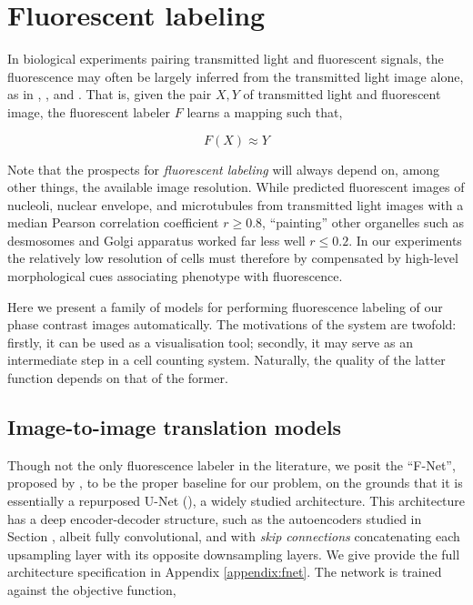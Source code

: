
\section{Fluorescent labeling}
\label{sec:fluorescent_labeling}

In biological experiments pairing transmitted light and fluorescent signals, the fluorescence may often be largely inferred from the transmitted light image alone, as in \cite{christiansen2018silico}, \cite{ounkomol2018label}, and \cite{lee2018deephcs}. That is, given the pair $X, Y$ of transmitted light and fluorescent image, the fluorescent labeler $F$ learns a mapping such that,

\begin{equation}
F(X) \approx Y
\end{equation}

Note that the prospects for \emph{fluorescent labeling} will always depend on, among other things, the available image resolution. While \cite{ounkomol2018label} predicted fluorescent images of nucleoli, nuclear envelope, and microtubules from transmitted light images with a median Pearson correlation coefficient $r \geq 0.8$, ``painting'' other organelles such as desmosomes and Golgi apparatus worked far less well $r \leq 0.2$. In our experiments the relatively low resolution of cells must therefore by compensated by high-level morphological cues associating phenotype with fluorescence.

Here we present a family of models for performing fluorescence labeling of our phase contrast images automatically. The motivations of the system are twofold: firstly, it can be used as a visualisation tool; secondly, it may serve as an intermediate step in a cell counting system. Naturally, the quality of the latter function depends on that of the former.

\subsection{Image-to-image translation models}
\label{subsec:image_to_image}

Though not the only fluorescence labeler in the literature, we posit the ``F-Net'', proposed by \cite{ounkomol2018label}, to be the proper baseline for our problem, on the grounds that it is essentially a repurposed U-Net (\cite{ronneberger2015u}), a widely studied architecture. This architecture has a deep encoder-decoder structure, such as the autoencoders studied in Section \label{subsubsec:dimensionality_reduction}, albeit fully convolutional, and with \emph{skip connections} concatenating each upsampling layer with its opposite downsampling layers. We give provide the full architecture specification in Appendix \ref{appendix:fnet}. The network is trained against the objective function,

